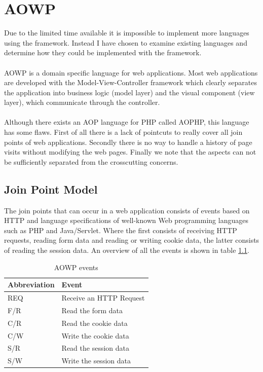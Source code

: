 \documentclass[a4paper]{report}
\begin{document}
\chapter{AOWP}
\label{chap:AOWP}
Due to the limited time available it is impossible to implement more languages using the framework. Instead I have chosen to examine existing languages and determine how they could be implemented with the framework.\\
\\
AOWP \cite{hokamura_aspect-oriented_2008} is a domain specific language for web applications. Most web applications are developed with the Model-View-Controller framework which clearly separates the application into business logic (model layer) and the visual component (view layer), which communicate through the controller.\\
\\
Although there exists an AOP language for PHP called AOPHP, this language has some flaws. First of all there is a lack of pointcuts to really cover all join points of web applications. Secondly there is no way to handle a history of page visits without modifying the web pages. Finally we note that the aspects can not be sufficiently separated from the crosscutting concerns.

\section{Join Point Model}
The join points that can occur in a web application consists of events based on HTTP and language specifications of well-known Web programming languages such as PHP and Java/Servlet. Where the first consists of receiving HTTP requests, reading form data and reading or writing cookie data, the latter consists of reading the session data. An overview of all the events is shown in table \ref{tab:AOWP_Events}.
\begin{table}
\centering
\begin{tabular}{l|l}
\hline
Abbreviation & Event\\
\hline
\hline
REQ & Receive an HTTP Request\\
\hline
F/R & Read the form data\\
\hline
C/R & Read the cookie data\\
\hline
C/W & Write the cookie data\\
\hline
S/R & Read the session data\\
\hline
S/W & Write the session data\\
\hline
\end{tabular}
\caption{AOWP events}
\label{tab:AOWP_Events}
\end{table}
\end{document}
